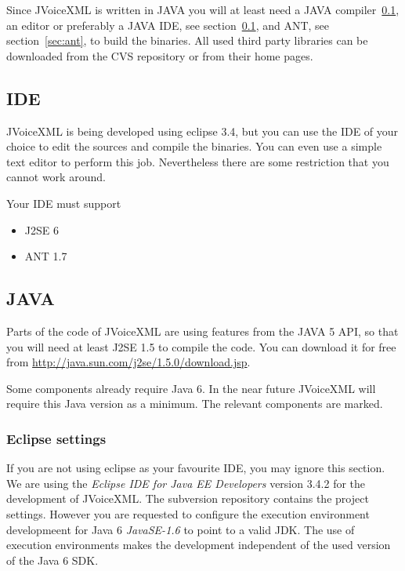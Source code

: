 \documentclass[11pt,a4paper]{article}
\begin{document}
Since JVoiceXML is written in JAVA you will at least need a
JAVA compiler~\ref{sec:ide}, an editor or preferably a JAVA
IDE, see section~\ref{sec:ide}, and ANT, see section~\ref{sec:ant}, to build the
binaries. All used third party libraries can be downloaded from the CVS 
repository or from their home pages.


\subsection{IDE}
\label{sec:ide}

JVoiceXML is being developed using eclipse 3.4, but you can use the IDE of your
choice to edit the sources and compile the binaries. You can even use a simple
text editor to perform this job. Nevertheless there are some restriction that
you cannot work around.

Your IDE must support

\begin{itemize}
\item J2SE 6
\item ANT 1.7
\end{itemize}

\subsection{JAVA}
\label{sec:java}

Parts of the code of JVoiceXML are using features from the JAVA 5 API, so that
you will need at least J2SE 1.5 to compile the code. You can download it
for free from \url{http://java.sun.com/j2se/1.5.0/download.jsp}.

Some components already require Java 6. In the near future JVoiceXML will
require this Java version as a minimum. The relevant components are marked. 

\subsubsection{Eclipse settings}
\label{sec:eclipse}

If you are not using eclipse as your favourite IDE, you may ignore this section.
We are using the \emph{Eclipse IDE for Java EE Developers} version 3.4.2 for
the development of JVoiceXML. The subversion repository contains the
project settings. However you are requested to configure the execution
environment developmeent for Java 6 \emph{JavaSE-1.6} to point to a valid JDK.
The use of execution environments makes the development independent of the used version of
the Java 6 SDK.
\end{document}
